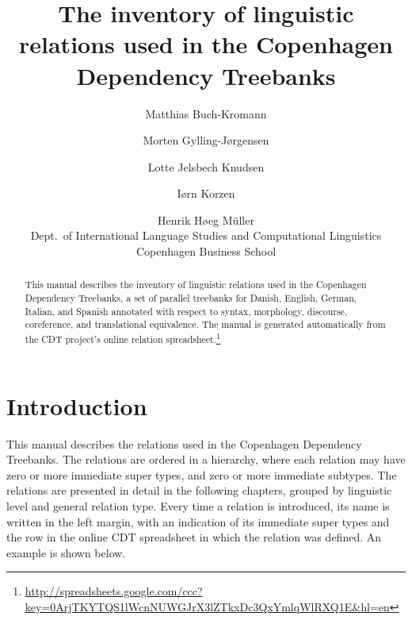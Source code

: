 \documentclass[11pt]{report}
\begin{document}
	\title{\sffamily\bfseries The inventory of linguistic relations used in the 
		Copenhagen Dependency Treebanks}
	\author{Matthias Buch-Kromann \and 
		Morten Gylling-Jørgensen \and
		Lotte Jelsbech Knudsen \and
		Iørn Korzen \and
		Henrik Høeg Müller \\[10pt]
		Dept.\ of International Language Studies and Computational
		Linguistics \\
		Copenhagen Business School}
	\maketitle

	\begin{abstract}
		This manual describes the inventory of linguistic relations used in the
		Copenhagen Dependency Treebanks, a set of parallel treebanks
		for Danish, English, German, Italian, and Spanish annotated
		with respect to syntax, morphology, discourse, coreference,
		and translational equivalence. The manual is generated
		automatically from the CDT project's online relation
		spreadsheet.\footnote{\url{http://spreadsheets.google.com/ccc?key=0ArjTKYTQS1lWcnNUWGJrX3lZTkxDc3QxYmlqWlRXQ1E&hl=en}}
	\end{abstract}

	\tableofcontents

	\newpage

	\chapter{Introduction}

	This manual describes the relations used in the Copenhagen
	Dependency Treebanks. The relations are ordered in a hierarchy,
	where each relation may have zero or more immediate super types,
	and zero or more immediate subtypes. The relations are presented
	in detail in the following chapters, grouped by linguistic level
	and general relation type. Every time a relation is introduced,
	its name is written in the left margin, with an indication of its
	immediate super types and the row in the online CDT spreadsheet
	in which the relation was defined. An example is shown
	below.\medskip
\end{document}
